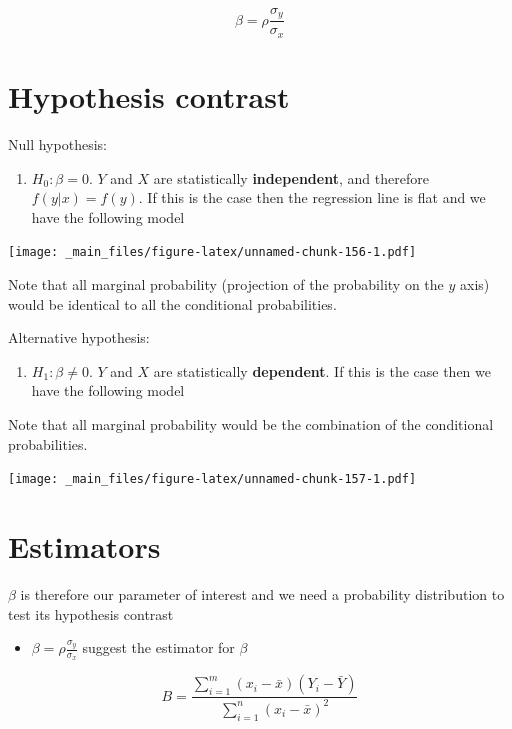 \documentclass[
]{book}
\providecommand{\tightlist}{%
  \setlength{\itemsep}{0pt}\setlength{\parskip}{0pt}}
\begin{document}
\[\beta=\rho\frac{\sigma_y}{\sigma_x}\]

\hypertarget{hypothesis-contrast-1}{%
\section{Hypothesis contrast}\label{hypothesis-contrast-1}}

Null hypothesis:

\begin{enumerate}
\def\labelenumi{\alph{enumi}.}
\tightlist
\item
  \(H_0: \beta=0\). \(Y\) and \(X\) are statistically \textbf{independent}, and therefore \(f(y|x)=f(y)\). If this is the case then the regression line is flat and we have the following model
\end{enumerate}

\texttt{[image: \_main\_files/figure-latex/unnamed-chunk-156-1.pdf]}

Note that all marginal probability (projection of the probability on the \(y\) axis) would be identical to all the conditional probabilities.

Alternative hypothesis:

\begin{enumerate}
\def\labelenumi{\alph{enumi}.}
\setcounter{enumi}{1}
\tightlist
\item
  \(H_1: \beta\neq 0\). \(Y\) and \(X\) are statistically \textbf{dependent}. If this is the case then we have the following model
\end{enumerate}

Note that all marginal probability would be the combination of the conditional probabilities.

\texttt{[image: \_main\_files/figure-latex/unnamed-chunk-157-1.pdf]}

\hypertarget{estimators-1}{%
\section{Estimators}\label{estimators-1}}

\(\beta\) is therefore our parameter of interest and we need a probability distribution to test its hypothesis contrast

\begin{itemize}
\tightlist
\item
  \(\beta=\rho\frac{\sigma_y}{\sigma_x}\) suggest the estimator for \(\beta\)
\end{itemize}

\[B=\frac{\sum_{i=1}^m(x_i-\bar{x})(Y_i-\bar{Y})}{\sum_{i=1}^n(x_i-\bar{x})^2}\]
\end{document}
